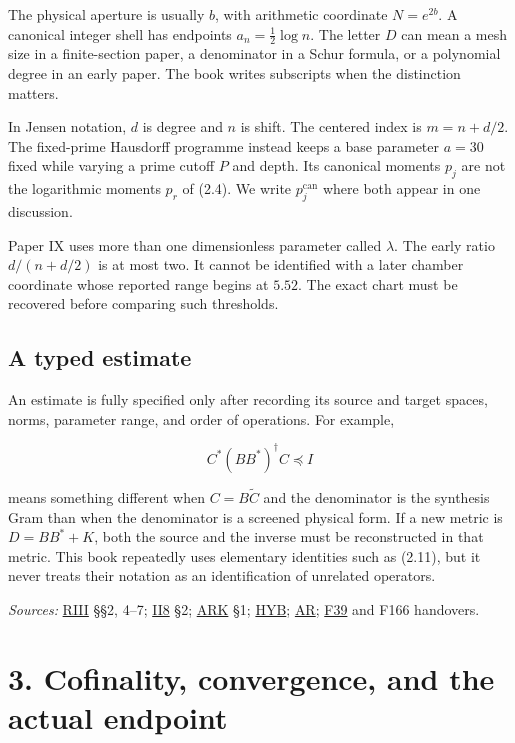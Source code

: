 \documentclass[
  10pt,
  a4paper,
  10pt,
  oneside,
  openany]{book}
\begin{document}
The physical aperture is usually \(b\), with arithmetic coordinate
\(N=e^{2b}\). A canonical integer shell has endpoints
\(a_n=\frac12\log n\). The letter \(D\) can mean a mesh size in a
finite-section paper, a denominator in a Schur formula, or a polynomial
degree in an early paper. The book writes subscripts when the
distinction matters.

In Jensen notation, \(d\) is degree and \(n\) is shift. The centered
index is \(m=n+d/2\). The fixed-prime Hausdorff programme instead keeps
a base parameter \(a=30\) fixed while varying a prime cutoff \(P\) and
depth. Its canonical moments \(p_j\) are not the logarithmic moments
\(p_r\) of (2.4). We write \(p_j^{\mathrm{can}}\) where both appear in
one discussion.

Paper IX uses more than one dimensionless parameter called \(\lambda\).
The early ratio \(d/(n+d/2)\) is at most two. It cannot be identified
with a later chamber coordinate whose reported range begins at \(5.52\).
The exact chart must be recovered before comparing such thresholds.

\subsection{A typed estimate}\label{a-typed-estimate}

An estimate is fully specified only after recording its source and
target spaces, norms, parameter range, and order of operations. For
example,

\[
C^*(BB^*)^\dagger C\preceq I
\tag{2.11}\label{eq:2.11}
\]

means something different when \(C=B\widetilde C\) and the denominator
is the synthesis Gram than when the denominator is a screened physical
form. If a new metric is \(D=BB^*+K\), both the source and the inverse
must be reconstructed in that metric. This book repeatedly uses
elementary identities such as (2.11), but it never treats their notation
as an identification of unrelated operators.

\emph{Sources:} \hyperref[source-riii]{RIII} §§2, 4--7;
\hyperref[source-ii8]{II8} §2; \hyperref[source-ark]{ARK} §1;
\hyperref[source-hyb]{HYB}; \hyperref[source-ar]{AR};
\hyperref[source-f39]{F39} and F166 handovers.

\section{3. Cofinality, convergence, and the actual
endpoint}\label{ch-endpoints}
\end{document}

